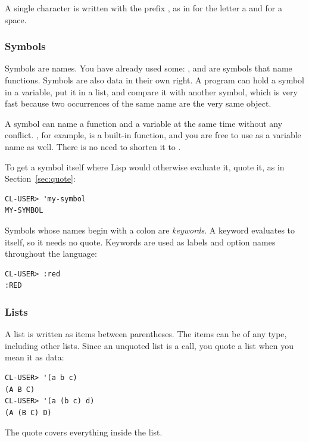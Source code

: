 A single character is written with the prefix \code{\#\textbackslash}, as in
 for the letter a and  for a space.

\subsubsection{Symbols}

Symbols are names. You have already used some: \code{+},
 and  are symbols that name functions.
Symbols are also data in their own right. A program can hold a
symbol in a variable, put it in a list, and compare it with another
symbol, which is very fast because two occurrences of the same name
are the very same object.

A symbol can name a function and a variable at the same time without
any conflict. , for example, is a built-in function, and
you are free to use  as a variable name as well. There is
no need to shorten it to .

To get a symbol itself where Lisp would otherwise evaluate it, quote
it, as in Section~\ref{sec:quote}:

\begin{verbatim}
CL-USER> 'my-symbol
MY-SYMBOL
\end{verbatim}

Symbols whose names begin with a colon are \emph{keywords}. A keyword
evaluates to itself, so it needs no quote. Keywords are used as
labels and option names throughout the language:

\begin{verbatim}
CL-USER> :red
:RED
\end{verbatim}

\subsubsection{Lists}

A list is written as items between parentheses. The items can be
of any type, including other lists. Since an unquoted list is a call,
you quote a list when you mean it as data:

\begin{verbatim}
CL-USER> '(a b c)
(A B C)
CL-USER> '(a (b c) d)
(A (B C) D)
\end{verbatim}

The quote covers everything inside the list.

